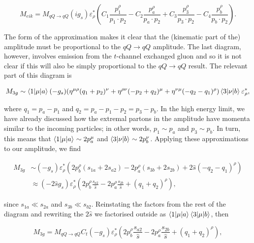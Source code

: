 \begin{equation}
M_{eik} = M_{qQ \to qQ} (i g_s) \varepsilon_\rho^* \left(C_1\frac{p_1^\rho}{p_1 \cdot p_2} - C_2\frac{p_a^\rho}{p_a \cdot p_2} + C_3\frac{p_3^\rho}{p_3 \cdot p_2} - C_4\frac{p_b^\rho}{p_b \cdot p_2}  \right).
\end{equation}

The form of the approximation makes it clear that the (kinematic part of the) amplitude must be proportional to the $qQ \to qQ$ amplitude. The last diagram, however, involves emission from the $t$-channel exchanged gluon and so it is not clear if this will also be simply proportional to the $qQ \to qQ$ result. The relevant part of this diagram is

\begin{equation}
M_{3g} \sim \mathinner{\langle1\vert\mu\vert a\rangle}_{} (- g_s)(\eta^{\mu \rho}(q_1 + p_2)^\nu + \eta^{\rho \nu}(-p_2 + q_2)^\mu + \eta^{\nu \mu}(-q_2 - q_1)^\rho) \mathinner{\langle3\vert\nu\vert b\rangle}_{} \varepsilon^*_\rho,
\end{equation}

where $q_1 = p_a - p_1$ and $q_2 = p_a - p_1 -p_2 = p_3 - p_b$. In the high energy limit, we have already discussed how the extremal partons in the amplitude have momenta similar to the incoming particles; in other words, $p_1 \sim p_a$ and $p_3 \sim p_b$. In turn, this means that $\mathinner{\langle1\vert\mu\vert a\rangle}_{} \sim 2p_a^\mu$ and $\mathinner{\langle3\vert\nu\vert b\rangle}_{} \sim 2p_b^\nu$. Applying these approximations to our amplitude, we find 

\begin{equation}
\begin{split}
M_{3g} &\sim (- g_s)\varepsilon_\rho^*(2p_b^\rho(s_{1a} + 2 s_{a2}) - 2 p_a^\rho (s_{3b} + 2 s_{2b}) + 2 \hat{s} (-q_2 - q_1)^\rho) \\
& \approx (- 2 \hat{s}  g_s)\varepsilon_\rho^*  \left (2p_b^\rho \frac{s_{a2}}{\hat{s}} - 2 p_a^\rho \frac{s_{2b}}{\hat{s}} + (q_1 + q_2)^\rho \right),
\end{split}
\end{equation}

since $s_{1a} \ll s_{2a}$ and $s_{3b} \ll s_{b2}$. Reinstating the factors from the rest of the diagram and rewriting the $2 \hat{s}$ we factorised outside as $\mathinner{\langle1\vert\mu\vert a\rangle}_{} \mathinner{\langle3\vert\mu\vert b\rangle}_{}$, then

\begin{equation}
M_{3g} = M_{qQ \to qQ} C_t(-g_s)\varepsilon_\rho^*  \left (2p_b^\rho \frac{s_{a2}}{\hat{s}} - 2 p_a^\rho \frac{s_{2b}}{\hat{s}} + (q_1 + q_2)^\rho \right),
\end{equation}

